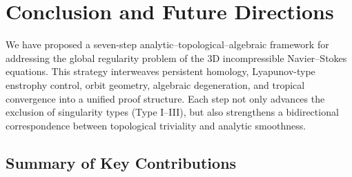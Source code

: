 \documentclass[11pt]{article}
\theoremstyle{definition}
\begin{document}

\section{Conclusion and Future Directions}

We have proposed a seven-step analytic–topological–algebraic framework for addressing the global regularity problem of the 3D incompressible Navier–Stokes equations. This strategy interweaves persistent homology, Lyapunov-type enstrophy control, orbit geometry, algebraic degeneration, and tropical convergence into a unified proof structure. Each step not only advances the exclusion of singularity types (Type I–III), but also strengthens a bidirectional correspondence between topological triviality and analytic smoothness.

\subsection*{Summary of Key Contributions}
\end{document}
